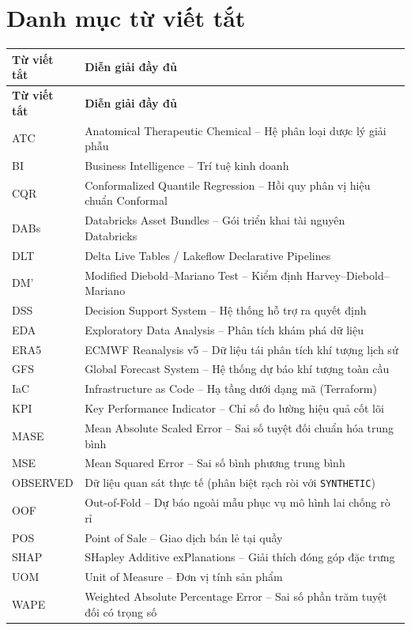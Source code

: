 \chapter*{Danh mục từ viết tắt}

\begin{longtable}{p{}p{}}
\toprule
\textbf{Từ viết tắt} & \textbf{Diễn giải đầy đủ} \\
\midrule
\endfirsthead
\toprule
\textbf{Từ viết tắt} & \textbf{Diễn giải đầy đủ} \\
\midrule
\endhead
ATC & Anatomical Therapeutic Chemical -- Hệ phân loại dược lý giải phẫu \\
BI & Business Intelligence -- Trí tuệ kinh doanh \\
CQR & Conformalized Quantile Regression -- Hồi quy phân vị hiệu chuẩn Conformal \\
DABs & Databricks Asset Bundles -- Gói triển khai tài nguyên Databricks \\
DLT & Delta Live Tables / Lakeflow Declarative Pipelines \\
DM' & Modified Diebold--Mariano Test -- Kiểm định Harvey--Diebold--Mariano \\
DSS & Decision Support System -- Hệ thống hỗ trợ ra quyết định \\
EDA & Exploratory Data Analysis -- Phân tích khám phá dữ liệu \\
ERA5 & ECMWF Reanalysis v5 -- Dữ liệu tái phân tích khí tượng lịch sử \\
GFS & Global Forecast System -- Hệ thống dự báo khí tượng toàn cầu \\
IaC & Infrastructure as Code -- Hạ tầng dưới dạng mã (Terraform) \\
KPI & Key Performance Indicator -- Chỉ số đo lường hiệu quả cốt lõi \\
MASE & Mean Absolute Scaled Error -- Sai số tuyệt đối chuẩn hóa trung bình \\
MSE & Mean Squared Error -- Sai số bình phương trung bình \\
OBSERVED & Dữ liệu quan sát thực tế (phân biệt rạch ròi với \texttt{SYNTHETIC}) \\
OOF & Out-of-Fold -- Dự báo ngoài mẫu phục vụ mô hình lai chống rò rỉ \\
POS & Point of Sale -- Giao dịch bán lẻ tại quầy \\
SHAP & SHapley Additive exPlanations -- Giải thích đóng góp đặc trưng \\
UOM & Unit of Measure -- Đơn vị tính sản phẩm \\
WAPE & Weighted Absolute Percentage Error -- Sai số phần trăm tuyệt đối có trọng số \\
\bottomrule
\end{longtable}
